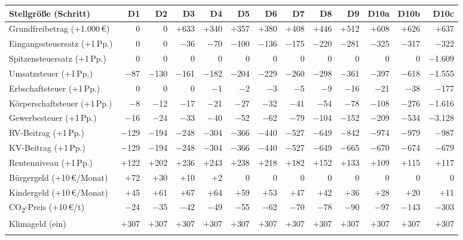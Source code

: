 \begin{tabular}{@{}l*{12}{r}@{}}
\toprule
Stellgröße (Schritt) & D1 & D2 & D3 & D4 & D5 & D6 & D7 & D8 & D9 & D10a & D10b & D10c \\
\midrule
Grundfreibetrag (+1.000\,\euro{}) & 0 & 0 & $+$633 & $+$340 & $+$357 & $+$380 & $+$408 & $+$446 & $+$512 & $+$608 & $+$626 & $+$637 \\
Eingangssteuersatz (+1\,Pp.) & 0 & 0 & $-$36 & $-$70 & $-$100 & $-$136 & $-$175 & $-$220 & $-$281 & $-$325 & $-$317 & $-$322 \\
Spitzensteuersatz (+1\,Pp.) & 0 & 0 & 0 & 0 & 0 & 0 & 0 & 0 & 0 & 0 & 0 & $-$1.609 \\
Umsatzsteuer (+1\,Pp.) & $-$87 & $-$130 & $-$161 & $-$182 & $-$204 & $-$229 & $-$260 & $-$298 & $-$361 & $-$397 & $-$618 & $-$1.555 \\
Erbschaftsteuer (+1\,Pp.) & 0 & 0 & 0 & $-$1 & $-$2 & $-$3 & $-$5 & $-$9 & $-$16 & $-$21 & $-$38 & $-$177 \\
Körperschaftsteuer (+1\,Pp.) & $-$8 & $-$12 & $-$17 & $-$21 & $-$27 & $-$32 & $-$41 & $-$54 & $-$78 & $-$108 & $-$276 & $-$1.616 \\
Gewerbesteuer (+1\,Pp.) & $-$16 & $-$24 & $-$33 & $-$40 & $-$52 & $-$62 & $-$79 & $-$104 & $-$152 & $-$209 & $-$534 & $-$3.128 \\
RV-Beitrag (+1\,Pp.) & $-$129 & $-$194 & $-$248 & $-$304 & $-$366 & $-$440 & $-$527 & $-$649 & $-$842 & $-$974 & $-$979 & $-$987 \\
KV-Beitrag (+1\,Pp.) & $-$129 & $-$194 & $-$248 & $-$304 & $-$366 & $-$440 & $-$527 & $-$649 & $-$665 & $-$670 & $-$674 & $-$679 \\
Rentenniveau (+1\,Pp.) & $+$122 & $+$202 & $+$236 & $+$243 & $+$238 & $+$218 & $+$182 & $+$152 & $+$133 & $+$109 & $+$115 & $+$117 \\
Bürgergeld (+10\,\euro{}/Monat) & $+$72 & $+$30 & $+$10 & $+$2 & 0 & 0 & 0 & 0 & 0 & 0 & 0 & 0 \\
Kindergeld (+10\,\euro{}/Monat) & $+$45 & $+$61 & $+$67 & $+$64 & $+$59 & $+$53 & $+$47 & $+$42 & $+$36 & $+$28 & $+$20 & $+$11 \\
CO\textsubscript{2}-Preis (+10\,\euro{}/t) & $-$24 & $-$35 & $-$42 & $-$49 & $-$55 & $-$62 & $-$70 & $-$78 & $-$90 & $-$97 & $-$143 & $-$303 \\
Klimageld (ein) & $+$307 & $+$307 & $+$307 & $+$307 & $+$307 & $+$307 & $+$307 & $+$307 & $+$307 & $+$307 & $+$307 & $+$307 \\
\addlinespace

\end{tabular}
